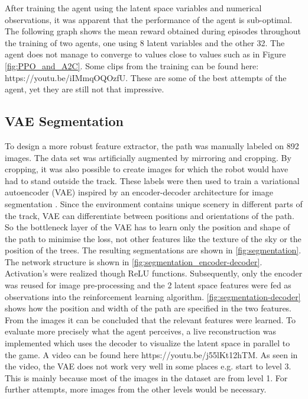 \documentclass[conference]{IEEEtran}
\begin{document}
After training the agent using the latent space variables and numerical observations, it was apparent that the performance of the agent is sub-optimal. The following graph shows the mean reward obtained during episodes throughout the training of two agents, one using 8 latent variables and the other 32. The agent does not manage to converge to values close to values such as in Figure \ref{fig:PPO_and_A2C}. Some clips from the training can be found here: https://youtu.be/iIMmqOQOzfU. These are some of the best attempts of the agent, yet they are still not that impressive.



\subsection{VAE Segmentation} \label{VAE_Segmentation}
\label{Segmentation_training}
To design a more robust feature extractor, the path was manually labeled on 892 images. The data set was artificially augmented by mirroring and cropping. By cropping, it was also possible to create images for which the robot would have had to stand outside the track. These labels were then used to train a variational autoencoder (VAE) inspired by an encoder-decoder architecture for image segmentation \cite{badrinarayanan2016segnet}. Since the environment contains unique scenery in different parts of the track, VAE can differentiate between positions and orientations of the path. So the bottleneck layer of the VAE has to learn only the position and shape of the path to minimise the loss, not other features like the texture of the sky or the position of the trees. The resulting segmentations are shown in \figurename  \ref{fig:segmentation}. The network structure is shown in \figurename  \ref{fig:segmentation_encoder-decoder}. Activation's were realized though ReLU functions. Subsequently, only the encoder was reused for image pre-processing and the 2 latent space features were fed as observations into the reinforcement learning algorithm. \figurename  \ref{fig:segmentation-decoder} shows how the position and width of the path are specified in the two features. From the images it can be concluded that the relevant features were learned. To evaluate more precisely what the agent perceives, a live reconstruction was implemented which uses the decoder to visualize the latent space in parallel to the game. A video can be found here https://youtu.be/j55lKt12hTM.
As seen in the video, the VAE does not work very well in some places e.g. start to level 3. This is mainly because most of the images in the dataset are from level 1. For further attempts, more images from the other levels would be necessary.
\end{document}

